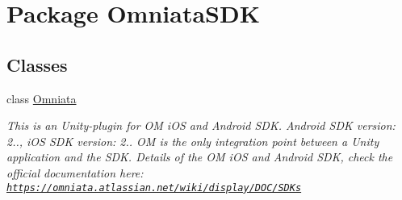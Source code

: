 \hypertarget{namespace_omniata_s_d_k}{\section{Package Omniata\+S\+D\+K}
\label{namespace_omniata_s_d_k}
}
\subsection*{Classes}
\begin{DoxyCompactItemize}
\item 
class \hyperlink{class_omniata_s_d_k_1_1_omniata}{Omniata}
\begin{DoxyCompactList}\small\item\em This is an Unity-\/plugin for O\+M i\+O\+S and Android S\+D\+K. Android S\+D\+K version\+: 2.., i\+O\+S S\+D\+K version\+: 2.. O\+M is the only integration point between a Unity application and the S\+D\+K. Details of the O\+M i\+O\+S and Android S\+D\+K, check the official documentation here\+: \href{https://omniata.atlassian.net/wiki/display/DOC/SDKs}{\tt https\+://omniata.\+atlassian.\+net/wiki/display/\+D\+O\+C/\+S\+D\+Ks} \end{DoxyCompactList}\end{DoxyCompactItemize}
